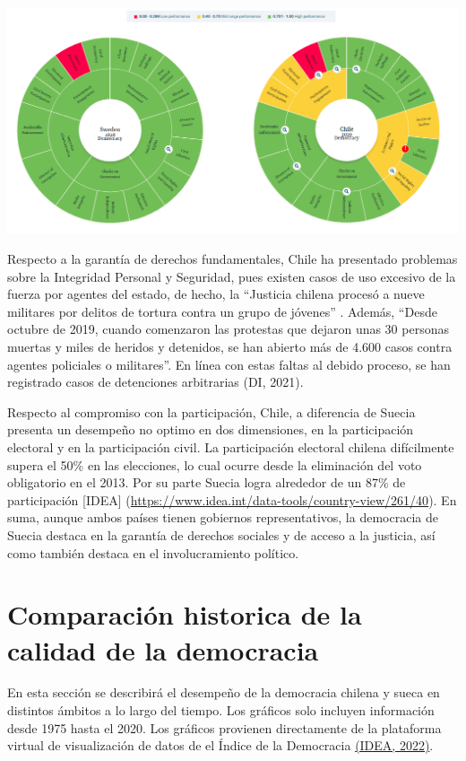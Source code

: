 \documentclass[12pt,twoside]{templates/facsothesis}
\begin{document}
\includegraphics{input/images/Chile-Suecia_DI.PNG}

Respecto a la garantía de derechos fundamentales, Chile ha presentado problemas sobre la Integridad Personal y Seguridad, pues existen casos de uso excesivo de la fuerza por agentes del estado, de hecho, la ``Justicia chilena procesó a nueve militares por delitos de tortura contra un grupo de jóvenes'' . Además, ``Desde octubre de 2019, cuando comenzaron las protestas que dejaron unas 30 personas muertas y miles de heridos y detenidos, se han abierto más de 4.600 casos contra agentes policiales o militares''. En línea con estas faltas al debido proceso, se han registrado casos de detenciones arbitrarias (DI, 2021).

Respecto al compromiso con la participación, Chile, a diferencia de Suecia presenta un desempeño no optimo en dos dimensiones, en la participación electoral y en la participación civil. La participación electoral chilena difícilmente supera el 50\% en las elecciones, lo cual ocurre desde la eliminación del voto obligatorio en el 2013. Por su parte Suecia logra alrededor de un 87\% de participación {[}IDEA{]} (\url{https://www.idea.int/data-tools/country-view/261/40}).
En suma, aunque ambos países tienen gobiernos representativos, la democracia de Suecia destaca en la garantía de derechos sociales y de acceso a la justicia, así como también destaca en el involucramiento político.

\hypertarget{comparaciuxf3n-historica-de-la-calidad-de-la-democracia}{%
\section{Comparación historica de la calidad de la democracia}\label{comparaciuxf3n-historica-de-la-calidad-de-la-democracia}}

En esta sección se describirá el desempeño de la democracia chilena y sueca en distintos ámbitos a lo largo del tiempo. Los gráficos solo incluyen información desde 1975 hasta el 2020. Los gráficos provienen directamente de la plataforma virtual de visualización de datos de el Índice de la Democracia \href{https://www.idea.int/gsod-indices/compare-countries-regions}{(IDEA, 2022)}.
\end{document}

